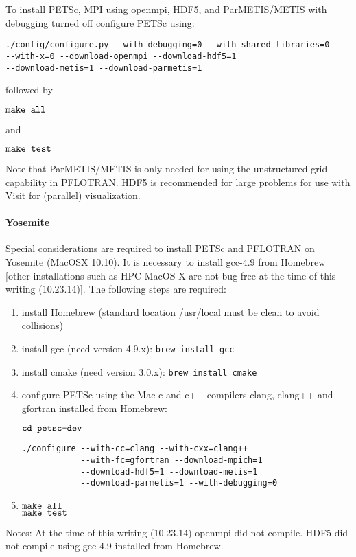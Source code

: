 To install PETSc, MPI using openmpi, HDF5, and ParMETIS/METIS with debugging turned off configure PETSc using:

\begin{verbatim}
./config/configure.py --with-debugging=0 --with-shared-libraries=0 
--with-x=0 --download-openmpi --download-hdf5=1 
--download-metis=1 --download-parmetis=1
\end{verbatim}

\noindent
followed by

$\verb|make all|$

\noindent
and

$\verb|make test|$

Note that ParMETIS/METIS is only needed for using the unstructured grid capability in PFLOTRAN. HDF5 is recommended for large problems for use with Visit for (parallel) visualization.

\paragraph{Yosemite} Special considerations are required to install PETSc and PFLOTRAN on Yosemite (MacOSX 10.10). It is necessary to install gcc-4.9 from Homebrew [other installations such as HPC MacOS X are not bug free at the time of this writing (10.23.14)]. The following steps are required:
\begin{enumerate}
\item install Homebrew (standard location /usr/local must be clean to avoid collisions)
\item install gcc (need version 4.9.x): {\tt brew install gcc}
\item install cmake (need version 3.0.x): {\tt brew install cmake}
\item configure PETSc using the Mac c and c++ compilers clang, clang++ and gfortran installed from Homebrew: 

$\verb|cd petsc-dev|$\\
\begin{verbatim}
./configure --with-cc=clang --with-cxx=clang++ 
            --with-fc=gfortran --download-mpich=1 
            --download-hdf5=1 --download-metis=1 
            --download-parmetis=1 --with-debugging=0
\end{verbatim} 

\item $\verb|make all|$\\ $\verb|make test|$
\end{enumerate}
Notes: At the time of this writing (10.23.14) openmpi did not compile. HDF5 did not compile using gcc-4.9 installed from Homebrew.

